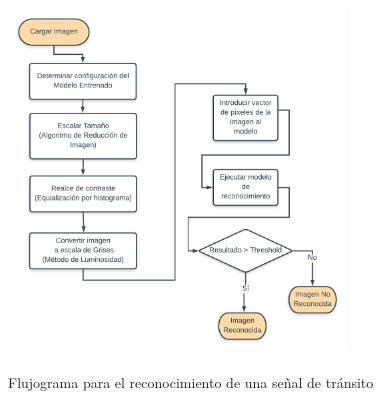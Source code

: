 		\begin{figure}[H]
			\begin{center}
			\includegraphics[width=0.8\textwidth,  height=10cm]{images/reconyzeFLow} 
			\end{center}
			\begin{center}
			\vspace{1em}
			\caption{\small{Flujograma para el reconocimiento de una señal de tránsito}}
			{\small{\fontsize{10}{16.8}\selectfont {Fuente: Elaboración propia}}}
			\end{center}
			\vspace{-1.5em}
		\end{figure}


	
